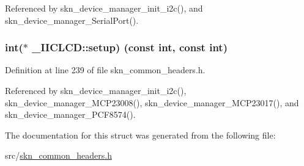Referenced by skn\+\_\+device\+\_\+manager\+\_\+init\+\_\+i2c(), and skn\+\_\+device\+\_\+manager\+\_\+\+Serial\+Port().

\subsubsection[{\texorpdfstring{setup}{setup}}]{\setlength{\rightskip}{0pt plus 5cm}int($\ast$ \+\_\+\+I\+I\+C\+L\+C\+D\+::setup) (const int, const int)}\hypertarget{struct___i_i_c_l_c_d_ab3052517b34cbf67239b91ccbd113c00}{}\label{struct___i_i_c_l_c_d_ab3052517b34cbf67239b91ccbd113c00}


Definition at line 239 of file skn\+\_\+common\+\_\+headers.\+h.



Referenced by skn\+\_\+device\+\_\+manager\+\_\+init\+\_\+i2c(), skn\+\_\+device\+\_\+manager\+\_\+\+M\+C\+P23008(), skn\+\_\+device\+\_\+manager\+\_\+\+M\+C\+P23017(), and skn\+\_\+device\+\_\+manager\+\_\+\+P\+C\+F8574().



The documentation for this struct was generated from the following file\+:\begin{DoxyCompactItemize}
\item 
src/\hyperlink{skn__common__headers_8h}{skn\+\_\+common\+\_\+headers.\+h}\end{DoxyCompactItemize}
